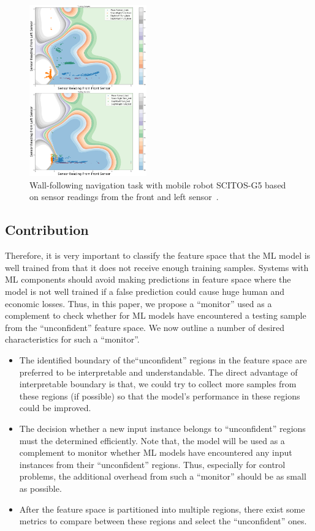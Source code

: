 \begin{figure}[t]
\centering
\includegraphics[width=0.45\textwidth]{FIG/toy1.png}
\caption{Wall-following navigation task with mobile robot SCITOS-G5 based on sensor readings from the front and left sensor~\cite{Dua:2017}.}
\label{fig:toy1}
\end{figure}


\subsection{Contribution}

Therefore, it is very important to classify the feature space that the ML model is well trained from that it does not receive enough training samples. Systems with ML components should avoid making predictions in feature space where the model is not well trained if a false prediction could cause huge human and economic losses.  Thus, in this paper, we propose a ``monitor'' used as a complement  to check whether for ML models have encountered a testing sample from the ``unconfident'' feature space.  We now outline a number of  desired characteristics for such a ``monitor''.\\

\begin{itemize}[\textbf{Preferred Characteristics}]
    \item  The identified  boundary of the``unconfident'' regions in the feature space are preferred to be interpretable and  understandable.  The  direct advantage of interpretable boundary is that, we could try to collect more samples from these regions (if possible) so that the model's performance in these regions could be improved.
    \item The decision  whether a new input instance belongs to ``unconfident'' regions must the determined efficiently.  Note that,  the model will be used as a complement  to  monitor whether ML models have encountered  any input instances  from their ``unconfident'' regions.  Thus, especially for control problems,  the additional overhead from such a ``monitor'' should be as small as possible.
    \item  After the feature space is partitioned into multiple regions, there exist some metrics to compare  between these regions and select the ``unconfident'' ones.
\end{itemize}

